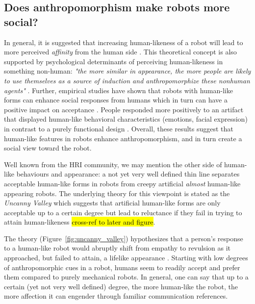 \documentclass[lettersize, apacite, twoside, HRI]{apa_HRI}
\begin{document}
%
%
%
%
%
%


\subsection{Does anthropomorphism make robots more social?}
\label{sec:more_social}

	In general, it is suggested that increasing human-likeness of a robot	 will lead to more perceived \textit{affinity} from the human side \cite{mori_uncanny_1970}. This theoretical concept is also supported by psychological determinants of perceiving human-likeness in something non-human: \textit{"the more similar in appearance, the more people are likely to use themselves as a source of induction and anthropomorphize these nonhuman agents"} \cite{epley_seeing_2007}. Further, empirical studies have shown that robots with human-like forms can enhance social responses from humans which in turn can have a positive impact on acceptance \cite{venkatesh_theoretical_2000,duffy_anthropomorphism_2003,goetz_cooperation_2002}.  People responded more positively to an artifact that displayed human-like behavioral characteristics (emotions, facial expression) in contrast to a purely functional design \cite{eyssel_anthropomorphic_2010,krach_can_2008,reeves_media_1996,riek_how_2009}. Overall, these results suggest that human-like features in robots enhance anthropomorphism, and in turn create a social view toward the robot.

Well known from the HRI community, we may mention the other side of human-like behaviours and appearance: a not yet very well defined thin line separates acceptable human-like forms in robots from creepy artificial \textit{almost} human-like appearing robots. The underlying theory for this viewpoint is stated as the \textit{Uncanny Valley} \cite{mori_uncanny_1970} which suggests that artificial human-like forms are only acceptable up to a certain degree but lead to reluctance if they fail in trying to attain human-likeness \hl{cross-ref to later and figure}.

The theory (Figure~\ref{fig:uncanny_valley}) hypothesizes that a person's response to a human-like robot would abruptly shift from empathy to revulsion as it approached, but failed to attain, a lifelike appearance \cite{mori_uncanny_1970}. Starting with low degrees of anthropomorphic cues in a robot, humans seem to readily accept and prefer them compared to purely mechanical robots. In general, one can say that up to a certain (yet not very well defined) degree, the more human-like the robot, the more affection it can engender through familiar communication references.
\end{document}

